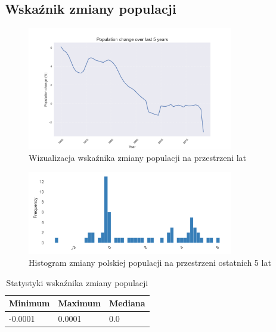 \documentclass[11pt]{article}
\begin{document}
\subsection*{Wskaźnik zmiany populacji}
\begin{figure}[H]
        \centering
        \includegraphics[width=0.8\textwidth]{polish_pop_change_5_years.png}
        \caption{Wizualizacja wskaźnika zmiany populacji na przestrzeni lat}
\end{figure}
\begin{figure}[H]
        \centering
        \includegraphics[width=0.8\textwidth]{images/histogram_zmiana_populacji.png}
        \caption{Histogram zmiany polskiej populacji na przestrzeni ostatnich 5 lat}
\end{figure}
\begin{table}[H]
        \centering
        \begin{tabular}{|l|l|l|}
        \hline
        Minimum & Maximum & Mediana \\ \hline
        -0.0001 & 0.0001 & 0.0 \\ \hline
        \end{tabular}
        \caption{Statystyki wskaźnika zmiany populacji}
        \end{table}
\end{document}
